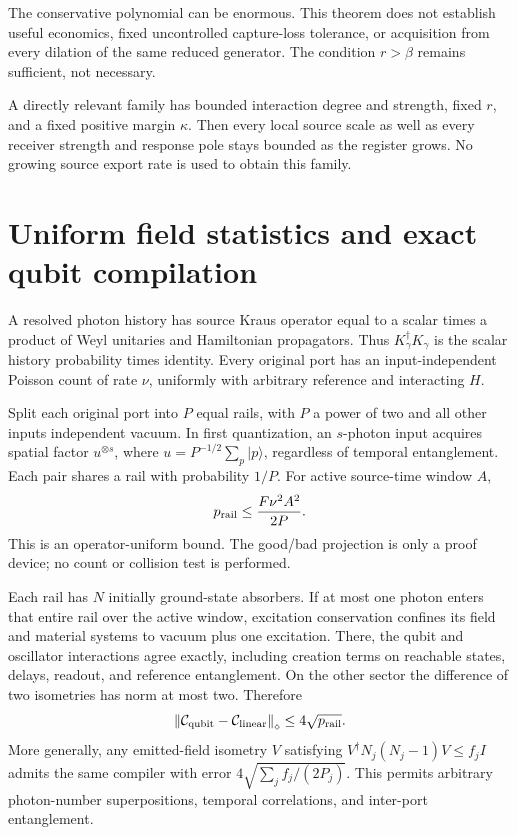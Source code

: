\documentclass[11pt,a4paper]{article}
\newcommand{\norm}[1]{\left\lVert #1\right\rVert}\newcommand{\ket}[1]{\lvert #1\rangle}\newcommand{\bra}[1]{\langle #1\rvert}
\begin{document}
The conservative polynomial can be enormous. This theorem does not establish useful economics, fixed uncontrolled capture-loss tolerance, or acquisition from every dilation of the same reduced generator. The condition $r>\beta$ remains sufficient, not necessary.

A directly relevant family has bounded interaction degree and strength, fixed $r$, and a fixed positive margin $\kappa$. Then every local source scale as well as every receiver strength and response pole stays bounded as the register grows. No growing source export rate is used to obtain this family.

\section{Uniform field statistics and exact qubit compilation}

A resolved photon history has source Kraus operator equal to a scalar times a product of Weyl unitaries and Hamiltonian propagators. Thus $K_\gamma^\dagger K_\gamma$ is the scalar history probability times identity. Every original port has an input-independent Poisson count of rate $\nu$, uniformly with arbitrary reference and interacting $H$.

Split each original port into $P$ equal rails, with $P$ a power of two and all other inputs independent vacuum. In first quantization, an $s$-photon input acquires spatial factor $u^{\otimes s}$, where $u=P^{-1/2}\sum_p\ket p$, regardless of temporal entanglement. Each pair shares a rail with probability $1/P$. For active source-time window $A$,
\begin{equation}
 p_{\rm rail}\le\frac{F\nu^2A^2}{2P}.
 \label{eq:rail}
\end{equation}
This is an operator-uniform bound. The good/bad projection is only a proof device; no count or collision test is performed.

Each rail has $N$ initially ground-state absorbers. If at most one photon enters that entire rail over the active window, excitation conservation confines its field and material systems to vacuum plus one excitation. There, the qubit and oscillator interactions agree exactly, including creation terms on reachable states, delays, readout, and reference entanglement. On the other sector the difference of two isometries has norm at most two. Therefore
\begin{equation}
 \norm{\cC_{\rm qubit}-\cC_{\rm linear}}_\diamond\le4\sqrt{p_{\rm rail}}.
 \label{eq:qubitcompiler}
\end{equation}
More generally, any emitted-field isometry $V$ satisfying $V^\dagger N_j(N_j-1)V\le f_jI$ admits the same compiler with error $4\sqrt{\sum_j f_j/(2P_j)}$. This permits arbitrary photon-number superpositions, temporal correlations, and inter-port entanglement.
\end{document}
